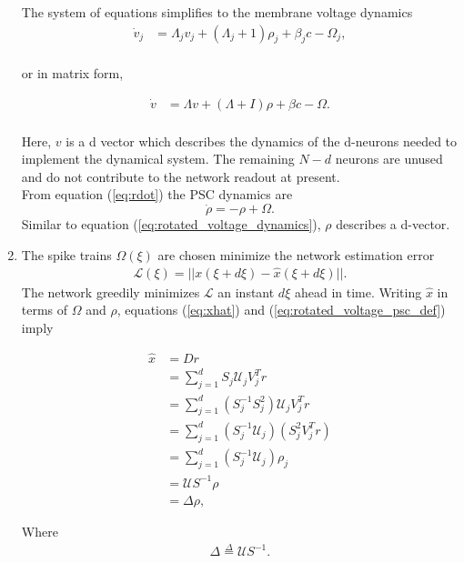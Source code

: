 \begin{enumerate}
The system of equations simplifies to the membrane voltage dynamics
\begin{align*}
    \dot{v}_j &= 
    \Lambda_j v_j
    +
    (\Lambda_j + 1) \rho_j 
    +
     \beta_j c
    -
   \Omega_j,\\
\end{align*}

or in matrix form,

\begin{align}
\label{eq:rotated_voltage_dynamics}
    \dot{v} &= 
    \Lambda v
    +
    (\Lambda + I) \rho 
    +
     \beta c
    -
   \Omega.
   \end{align}
   \\
Here, $v$ is a d vector which describes the dynamics of the d-neurons needed to implement the dynamical system. The remaining $N-d$ neurons are unused and do not contribute to the network readout at present.   \\
From equation (\ref{eq:rdot}) the PSC dynamics are
\begin{equation}
\label{eq:rho_dot}
    \dot{\rho} = -\rho + \Omega.
\end{equation}
Similar to equation (\ref{eq:rotated_voltage_dynamics}), $\rho$ describes a d-vector. 

 
   
   
\item The spike trains $\Omega(\xi)$ are chosen minimize the network estimation error
\begin{align}
    \mathcal{L}(\xi) =  || x(\xi + d\xi) - \hat{x}(\xi + d\xi) ||. 
\end{align}
The network greedily minimizes $\mathcal{L}$ an instant $d\xi$ ahead in time. Writing $\hat{x}$ in terms of $\Omega$ and $\rho$, equations (\ref{eq:xhat}) and (\ref{eq:rotated_voltage_psc_def}) imply 

\begin{align*}
    \hat{x} &= D r \\
    &= \sum_{j=1}^d S_j \mathcal{U}_j  V_j^T r\\
    &= \sum_{j=1}^d (S_j^{-1}S_j^2) \mathcal{U}_j  V_j^T r\\
    &=  \sum_{j=1}^d (S_j^{-1}  \mathcal{U}_j) (S_j^2 V_j^T r)\\
    &=  \sum_{j=1}^d (S_j^{-1}  \mathcal{U}_j) \rho_j \\
    &= \mathcal{U}S^{-1}\rho\\
    &= \Delta \rho, 
\end{align*}

Where
\begin{align}
    \label{eq:delta_dec}
    \Delta \overset{\Delta}{=} \mathcal{U} S^{-1}.
\end{align}


\end{enumerate}
